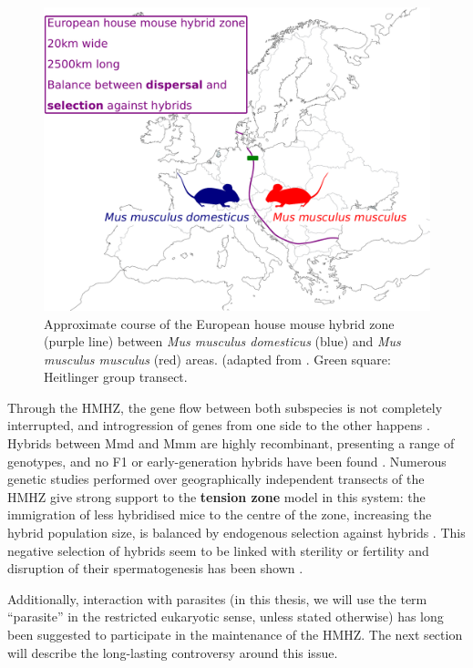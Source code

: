\begin{figure}[H]
    \centering
    \includegraphics[width=.7\linewidth,height=\textheight,keepaspectratio]{images/1introduction/Figure1.pdf}
    \caption{Approximate course of the European house mouse hybrid zone (purple line) between \textit{Mus musculus domesticus} (blue) and \textit{Mus musculus musculus} (red) areas. (adapted from \cite{baird_where_2012}. Green square: Heitlinger group transect.}
\end{figure}

Through the HMHZ, the gene flow between both subspecies is not completely interrupted, and introgression of genes from one side to the other happens \citep{macholan_genetic_2007, macholan_assessing_2011, macholan_widespread_2019, raufaste_inferences_2005}. Hybrids between Mmd and Mmm are highly recombinant, presenting a range of genotypes, and no F1 or early-generation hybrids have been found \citep{macholan_genetic_2007}. Numerous genetic studies performed over geographically independent transects of the HMHZ \parencite[e.g.][]{macholan_genetic_2007, payseur_differential_2004, raufaste_inferences_2005} give strong support to the \textbf{tension zone} model in this system: the immigration of less hybridised mice to the centre of the zone, increasing the hybrid population size, is balanced by endogenous selection against hybrids \citep{baird_what_2012, barton_analysis_1985, boursot_evolution_1993}. This negative selection of hybrids seem to be linked with sterility or fertility \citep{baird_what_2012} and disruption of their spermatogenesis has been shown \citep{albrechtova_sperm-related_2012, martincova_sperm_2019, turner_reduced_2012, turner_genome-wide_2014}.
\par
Additionally, interaction with parasites (in this thesis, we will use the term “parasite” in the restricted eukaryotic sense, unless stated otherwise) has long been suggested to participate in the maintenance of the HMHZ. The next section will describe the long-lasting controversy around this issue.

